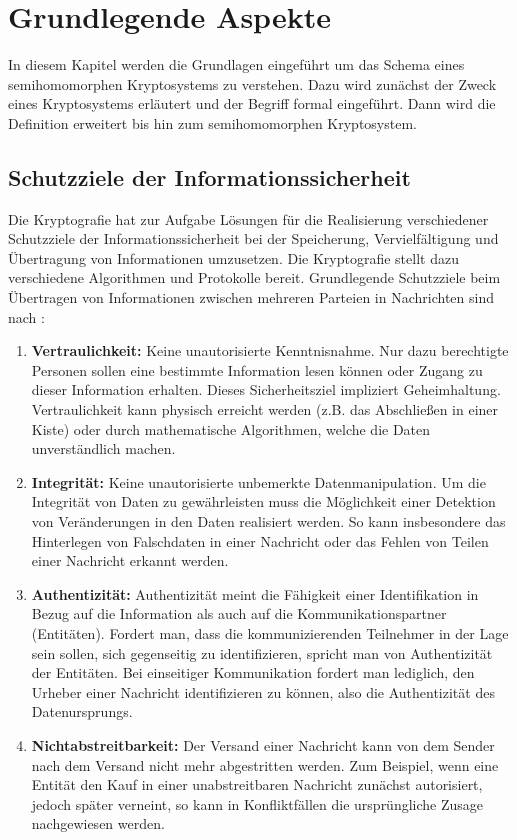 \chapter{Grundlegende Aspekte}
\label{HK}

In diesem Kapitel werden die Grundlagen eingeführt um das Schema eines semihomomorphen Kryptosystems zu verstehen. Dazu wird zunächst der Zweck eines Kryptosystems erläutert und der Begriff formal eingeführt. Dann wird die Definition erweitert bis hin zum semihomomorphen Kryptosystem.

\section{Schutzziele der Informationssicherheit}
Die Kryptografie hat zur Aufgabe Lösungen für die Realisierung verschiedener Schutzziele der Informationssicherheit bei der Speicherung, Vervielfältigung und Übertragung von Informationen umzusetzen. Die Kryptografie stellt dazu verschiedene Algorithmen und Protokolle bereit. Grundlegende Schutzziele beim Übertragen von Informationen zwischen mehreren Parteien in  Nachrichten sind nach \cite[p.4]{menezes1996handbook}\cite[p.2]{delfs2002introduction}:
\begin{enumerate}
	\item \textbf{Vertraulichkeit:} Keine unautorisierte Kenntnisnahme. Nur dazu berechtigte Personen sollen eine bestimmte Information lesen können oder Zugang zu dieser Information erhalten. Dieses Sicherheitsziel impliziert Geheimhaltung. Vertraulichkeit kann physisch erreicht werden (z.B. das Abschließen in einer Kiste) oder durch mathematische Algorithmen, welche die Daten unverständlich machen. 
	\item \textbf{Integrität:} Keine unautorisierte unbemerkte Datenmanipulation. Um die Integrität von Daten zu gewährleisten muss die Möglichkeit einer Detektion von Veränderungen in den Daten realisiert werden.  So kann insbesondere das Hinterlegen von Falschdaten in einer Nachricht oder das Fehlen von Teilen einer Nachricht erkannt werden.
	\item \textbf{Authentizität:} Authentizität meint die Fähigkeit einer Identifikation in Bezug auf die Information als auch auf die Kommunikationspartner (Entitäten). Fordert man, dass die kommunizierenden Teilnehmer in der Lage sein sollen, sich gegenseitig zu identifizieren, spricht man von Authentizität der Entitäten. Bei einseitiger Kommunikation fordert man lediglich, den Urheber einer Nachricht identifizieren zu können, also die Authentizität des Datenursprungs.
	\item \textbf{Nichtabstreitbarkeit:} Der Versand einer Nachricht kann von dem Sender nach dem Versand nicht mehr abgestritten werden. Zum Beispiel, wenn eine Entität den Kauf in einer unabstreitbaren Nachricht zunächst autorisiert, jedoch später verneint, so kann in Konfliktfällen die ursprüngliche Zusage nachgewiesen werden.
\end{enumerate}

